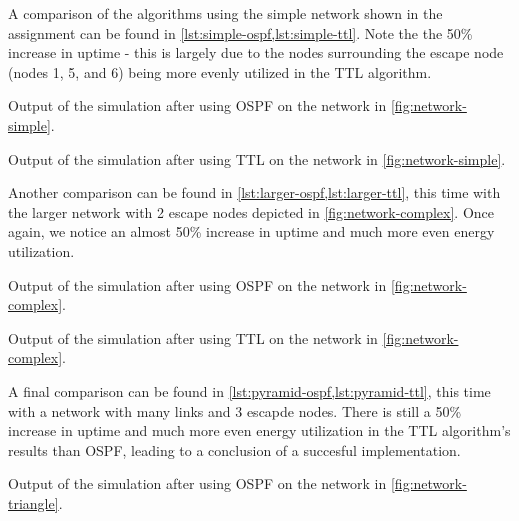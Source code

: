 \documentclass[headings=optiontoheadandtoc,listof=totoc,parskip=full]{scrartcl}
\begin{document}
A comparison of the algorithms using the simple network shown in the assignment can be found in \cref{lst:simple-ospf,lst:simple-ttl}. Note the the 50\% increase in uptime - this is largely due to the nodes surrounding the escape node (nodes 1, 5, and 6) being more evenly utilized in the TTL algorithm.

\begin{listing}[H]
    \caption{Output of the simulation after using OSPF on the network in \cref{fig:network-simple}.}
    \label{lst:simple-ospf}
\end{listing}

\begin{listing}[H]
    \caption{Output of the simulation after using TTL on the network in \cref{fig:network-simple}.}
    \label{lst:simple-ttl}
\end{listing}

Another comparison can be found in \cref{lst:larger-ospf,lst:larger-ttl}, this time with the larger network with 2 escape nodes depicted in \cref{fig:network-complex}. Once again, we notice an almost 50\% increase in uptime and much more even energy utilization.

\begin{listing}[H]
    \caption{Output of the simulation after using OSPF on the network in \cref{fig:network-complex}.}
    \label{lst:larger-ospf}
\end{listing}

\begin{listing}[H]
    \caption{Output of the simulation after using TTL on the network in \cref{fig:network-complex}.}
    \label{lst:larger-ttl}
\end{listing}

A final comparison can be found in \cref{lst:pyramid-ospf,lst:pyramid-ttl}, this time with a network with many links and 3 escapde nodes. There is still a 50\% increase in uptime and much more even energy utilization in the TTL algorithm's results than OSPF, leading to a conclusion of a succesful implementation.

\begin{listing}[H]
    \caption{Output of the simulation after using OSPF on the network in \cref{fig:network-triangle}.}
    \label{lst:pyramid-ospf}
\end{listing}
\end{document}
